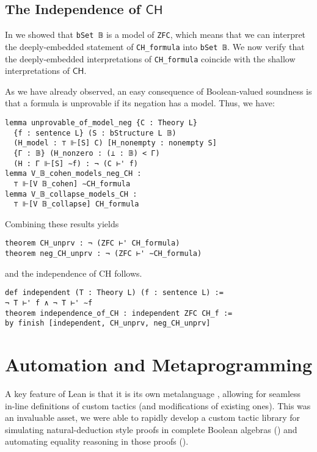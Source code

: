 \documentclass[sigplan,screen]{acmart}
\newcommand{\lil}{\lstinline}
\newcommand{\CH}{\mathsf{CH}}
\theoremstyle{definition}
\begin{document}


\subsection{The Independence of \texorpdfstring{\(\CH\)}{CH}} \label{subsect:forcing:independence}

In  we showed that \lil{bSet 𝔹} is a model of \lil{ZFC},
which means that we can interpret the deeply-embedded statement of \lil{CH_formula} into
\lil{bSet 𝔹}.
We now verify that the deeply-embedded interpretations of \lil{CH_formula} coincide with the shallow interpretations of \(\mathsf{CH}\).

As we have already observed, an easy consequence of Boolean-valued soundness is that a formula is unprovable if its negation has a model. Thus, we have:
\begin{lstlisting}
lemma unprovable_of_model_neg {C : Theory L}
  {f : sentence L} (S : bStructure L 𝔹)
  (H_model : ⊤ ⊩[S] C) [H_nonempty : nonempty S]
  {Γ : 𝔹} (H_nonzero : (⊥ : 𝔹) < Γ)
  (H : Γ ⊩[S] ∼f) : ¬ (C ⊢' f)
lemma V_𝔹_cohen_models_neg_CH :
  ⊤ ⊩[V 𝔹_cohen] ∼CH_formula
lemma V_𝔹_collapse_models_CH :
  ⊤ ⊩[V 𝔹_collapse] CH_formula
\end{lstlisting}
\noindent Combining these results yields
\begin{lstlisting}
theorem CH_unprv : ¬ (ZFC ⊢' CH_formula)
theorem neg_CH_unprv : ¬ (ZFC ⊢' ∼CH_formula)
\end{lstlisting}
\noindent and the independence of CH follows.
\begin{lstlisting}
def independent (T : Theory L) (f : sentence L) :=
¬ T ⊢' f ∧ ¬ T ⊢' ∼f
theorem independence_of_CH : independent ZFC CH_f :=
by finish [independent, CH_unprv, neg_CH_unprv]
\end{lstlisting}
\section{Automation and Metaprogramming}
\label{sect:metaprogramming}

A key feature of Lean is that it is its own metalanguage \cite{Ebner:2017:MFF:3136534.3110278}, allowing for seamless in-line definitions of custom tactics (and modifications of existing ones).
This was an invaluable asset, we were able to rapidly develop a custom tactic library for simulating natural-deduction style proofs in complete Boolean algebras () and automating equality reasoning in those proofs ().
\end{document}
